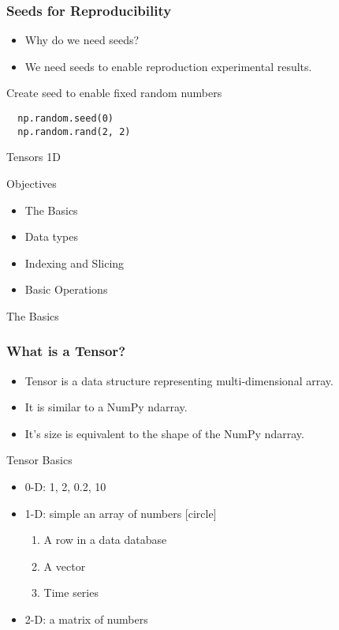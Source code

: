 \documentclass[14 pt]{beamer}
\let\olditem\item
\renewcommand{\item}{\olditem\vspace{4pt}}
\begin{document}
\begin{frame}[fragile]
  \frametitle{Seeds for Reproducibility}
  \begin{itemize}
  \item Why do we need seeds?
  \item We need seeds to enable reproduction experimental results.
  \end{itemize}
  \begin{block}{Create seed to enable fixed random numbers }
\begin{verbatim}
  np.random.seed(0)
  np.random.rand(2, 2)
\end{verbatim}
  \end{block}
\end{frame}

\begin{frame}
\begin{center}
\Large{Tensors 1D} 
\end{center}
\end{frame}

\begin{frame}{Objectives}
\begin{itemize}
  \item The Basics
  \item Data types
  \item Indexing and Slicing
  \item Basic Operations
  \end{itemize}
\end{frame}

\begin{frame}
  \Large{The Basics}
\end{frame}
\begin{frame}
  \frametitle{What is a Tensor?}
  \begin{itemize}
  \item Tensor is a data structure representing multi-dimensional array. 
  \item It is similar to a NumPy ndarray. 
  \item It’s size is equivalent to the shape of the NumPy ndarray.
  \end{itemize}
\end{frame}
\begin{frame}{Tensor Basics}
  \begin{itemize}
  \item 0-D: 1, 2, 0.2, 10
  \item 1-D:  simple an array of numbers
 [circle]
    \begin{enumerate}
    \item A row in a data database
    \item A vector
    \item Time series
    \end{enumerate}
  \item 2-D: a matrix of numbers
  \end{itemize}
\end{frame}
\end{document}
